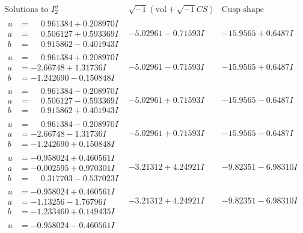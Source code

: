 \documentclass[1p]{elsarticle_modified}
\theoremstyle{definition}
\newcommand{\I}{\sqrt{-1}}
\begin{document}
$$\begin{array}{c|c|c}  
\text{Solutions to }I^u_{2}& \I (\text{vol} + \sqrt{-1}CS) & \text{Cusp shape}\\
 \hline 
\begin{aligned}
u &= \phantom{-}0.961384 + 0.208970 I \\
a &= \phantom{-}0.506127 + 0.593369 I \\
b &= \phantom{-}0.915862 - 0.401943 I\end{aligned}
 & -5.02961 - 0.71593 I & -15.9565 + 0.6487 I \\ \hline\begin{aligned}
u &= \phantom{-}0.961384 + 0.208970 I \\
a &= -2.66748 + 1.31736 I \\
b &= -1.242690 - 0.150848 I\end{aligned}
 & -5.02961 - 0.71593 I & -15.9565 + 0.6487 I \\ \hline\begin{aligned}
u &= \phantom{-}0.961384 - 0.208970 I \\
a &= \phantom{-}0.506127 - 0.593369 I \\
b &= \phantom{-}0.915862 + 0.401943 I\end{aligned}
 & -5.02961 + 0.71593 I & -15.9565 - 0.6487 I \\ \hline\begin{aligned}
u &= \phantom{-}0.961384 - 0.208970 I \\
a &= -2.66748 - 1.31736 I \\
b &= -1.242690 + 0.150848 I\end{aligned}
 & -5.02961 + 0.71593 I & -15.9565 - 0.6487 I \\ \hline\begin{aligned}
u &= -0.958024 + 0.460561 I \\
a &= -0.002595 + 0.970301 I \\
b &= \phantom{-}0.317703 - 0.537023 I\end{aligned}
 & -3.21312 + 4.24921 I & -9.82351 - 6.98310 I \\ \hline\begin{aligned}
u &= -0.958024 + 0.460561 I \\
a &= -1.13256 - 1.76796 I \\
b &= -1.233460 + 0.149435 I\end{aligned}
 & -3.21312 + 4.24921 I & -9.82351 - 6.98310 I \\ \hline\begin{aligned}
u &= -0.958024 - 0.460561 I \\

\end{aligned}
\end{array}$$
\end{document}
